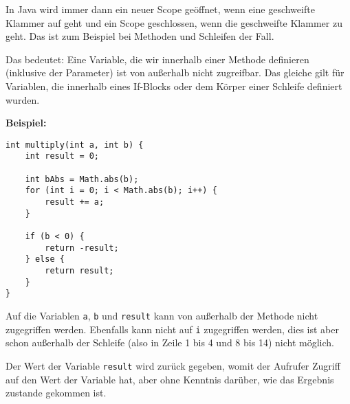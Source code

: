 
In Java wird immer dann ein neuer Scope geöffnet, wenn eine geschweifte Klammer auf geht und ein Scope geschlossen, wenn die geschweifte Klammer zu geht. Das ist zum Beispiel bei Methoden und Schleifen der Fall.

Das bedeutet: Eine Variable, die wir innerhalb einer Methode definieren (inklusive der Parameter) ist von außerhalb nicht zugreifbar. Das gleiche gilt für Variablen, die innerhalb eines If-Blocks oder dem Körper einer Schleife definiert wurden.

\textbf{Beispiel:} \\
\begin{lstlisting}
int multiply(int a, int b) {
	int result = 0;

	int bAbs = Math.abs(b);
	for (int i = 0; i < Math.abs(b); i++) {
		result += a;
	}

	if (b < 0) {
		return -result;
	} else {
		return result;
	}
}
\end{lstlisting}
Auf die Variablen \texttt{a}, \texttt{b} und \texttt{result} kann von außerhalb der Methode nicht zugegriffen werden. Ebenfalls kann nicht auf \texttt{i} zugegriffen werden, dies ist aber schon außerhalb der Schleife (also in Zeile 1 bis 4 und 8 bis 14) nicht möglich.

Der Wert der Variable \texttt{result} wird zurück gegeben, womit der Aufrufer Zugriff auf den Wert der Variable hat, aber ohne Kenntnis darüber, wie das Ergebnis zustande gekommen ist.